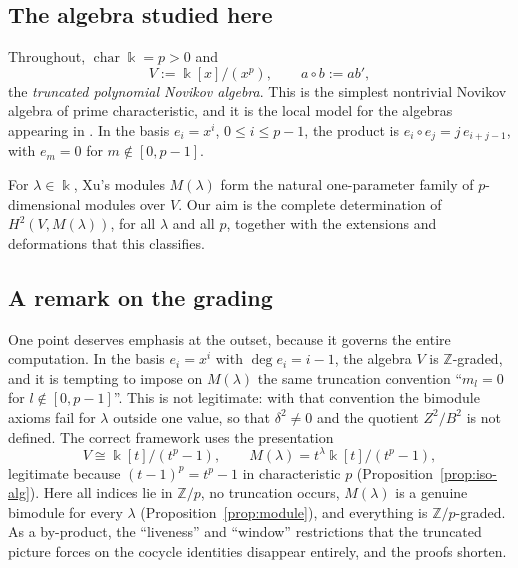 \documentclass[11pt,reqno]{amsart}
\theoremstyle{plain}
\theoremstyle{definition}
\newcommand{\kk}{\Bbbk}
\newcommand{\Zt}{Z^2}
\newcommand{\Bt}{B^2}
\newcommand{\Ht}{H^2}
\newcommand{\Zp}{\mathbb{Z}/p}
\begin{document}
\subsection{The algebra studied here}
Throughout, $\operatorname{char}\kk=p>0$ and
\[
V:=\kk[x]/(x^p),\qquad a\circ b:=ab' ,
\]
the \emph{truncated polynomial Novikov algebra}. This is the simplest nontrivial Novikov
algebra of prime characteristic, and it is the local model for the algebras appearing in
\cite{Xu1996}. In the basis $e_i=x^i$, $0\le i\le p-1$, the product is
$e_i\circ e_j=j\,e_{i+j-1}$, with $e_m=0$ for $m\notin[0,p-1]$.

For $\lambda\in\kk$, Xu's modules $M(\lambda)$ \cite{Xu1996} form the natural
one-parameter family of $p$-dimensional modules over $V$. Our aim is the complete
determination of $\Ht(V,M(\lambda))$, for all $\lambda$ and all $p$, together with the
extensions and deformations that this classifies.

\subsection{A remark on the grading}\label{sub:grading}
One point deserves emphasis at the outset, because it governs the entire computation. In the
basis $e_i=x^i$ with $\deg e_i=i-1$, the algebra $V$ is $\mathbb{Z}$-graded, and it is
tempting to impose on $M(\lambda)$ the same truncation convention ``$m_l=0$ for
$l\notin[0,p-1]$''. This is not legitimate: with that convention the bimodule axioms fail
for $\lambda$ outside one value, so that $\delta^2\ne0$ and the quotient $\Zt/\Bt$ is not
defined. The correct framework uses the presentation
\[
V\cong\kk[t]/(t^p-1),\qquad M(\lambda)=t^{\lambda}\kk[t]/(t^p-1),
\]
legitimate because $(t-1)^p=t^p-1$ in characteristic $p$ (Proposition~\ref{prop:iso-alg}).
Here all indices lie in $\Zp$, no truncation occurs, $M(\lambda)$ is a genuine bimodule for
every $\lambda$ (Proposition~\ref{prop:module}), and everything is $\Zp$-graded. As a
by-product, the ``liveness'' and ``window'' restrictions that the truncated picture forces
on the cocycle identities disappear entirely, and the proofs shorten.
\end{document}
